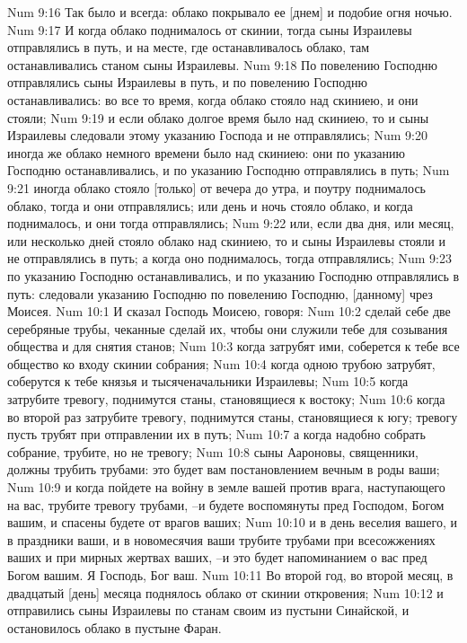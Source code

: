 Num 9:16  Так было и всегда: облако покрывало ее [днем] и подобие огня ночью.
Num 9:17  И когда облако поднималось от скинии, тогда сыны Израилевы отправлялись в путь, и на месте, где останавливалось облако, там останавливались станом сыны Израилевы.
Num 9:18  По повелению Господню отправлялись сыны Израилевы в путь, и по повелению Господню останавливались: во все то время, когда облако стояло над скиниею, и они стояли;
Num 9:19  и если облако долгое время было над скиниею, то и сыны Израилевы следовали этому указанию Господа и не отправлялись;
Num 9:20  иногда же облако немного времени было над скиниею: они по указанию Господню останавливались, и по указанию Господню отправлялись в путь;
Num 9:21  иногда облако стояло [только] от вечера до утра, и поутру поднималось облако, тогда и они отправлялись; или день и ночь стояло облако, и когда поднималось, и они тогда отправлялись;
Num 9:22  или, если два дня, или месяц, или несколько дней стояло облако над скиниею, то и сыны Израилевы стояли и не отправлялись в путь; а когда оно поднималось, тогда отправлялись;
Num 9:23  по указанию Господню останавливались, и по указанию Господню отправлялись в путь: следовали указанию Господню по повелению Господню, [данному] чрез Моисея.
Num 10:1  И сказал Господь Моисею, говоря:
Num 10:2  сделай себе две серебряные трубы, чеканные сделай их, чтобы они служили тебе для созывания общества и для снятия станов;
Num 10:3  когда затрубят ими, соберется к тебе все общество ко входу скинии собрания;
Num 10:4  когда одною трубою затрубят, соберутся к тебе князья и тысяченачальники Израилевы;
Num 10:5  когда затрубите тревогу, поднимутся станы, становящиеся к востоку;
Num 10:6  когда во второй раз затрубите тревогу, поднимутся станы, становящиеся к югу; тревогу пусть трубят при отправлении их в путь;
Num 10:7  а когда надобно собрать собрание, трубите, но не тревогу;
Num 10:8  сыны Аароновы, священники, должны трубить трубами: это будет вам постановлением вечным в роды ваши;
Num 10:9  и когда пойдете на войну в земле вашей против врага, наступающего на вас, трубите тревогу трубами, --и будете воспомянуты пред Господом, Богом вашим, и спасены будете от врагов ваших;
Num 10:10  и в день веселия вашего, и в праздники ваши, и в новомесячия ваши трубите трубами при всесожжениях ваших и при мирных жертвах ваших, --и это будет напоминанием о вас пред Богом вашим. Я Господь, Бог ваш.
Num 10:11  Во второй год, во второй месяц, в двадцатый [день] месяца поднялось облако от скинии откровения;
Num 10:12  и отправились сыны Израилевы по станам своим из пустыни Синайской, и остановилось облако в пустыне Фаран.
